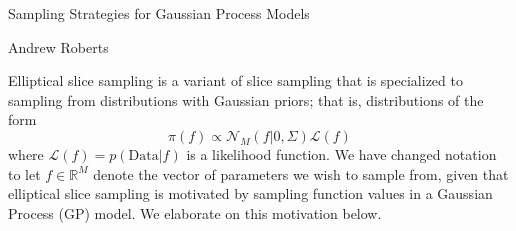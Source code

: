 \documentclass[12pt]{article}
\newcommand{\R}{\mathcal{R}}
\def\R{\mathbb{R}}
\begin{document}
 

\begin{center}
\Large
Sampling Strategies for Gaussian Process Models
\end{center}

\begin{flushright}
Andrew Roberts
\end{flushright} 

Elliptical slice sampling is a variant of slice sampling that is specialized to sampling from distributions with Gaussian priors; that is, distributions of the form 
\[\pi(f) \propto \mathcal{N}_M(f|0, \Sigma)\mathcal{L}(f)\]
where $\mathcal{L}(f) = p(\text{Data}|f)$ is a likelihood function. We have changed notation to let $f \in \R^M$ denote the vector of parameters we wish to sample from, given that elliptical slice sampling 
is motivated by sampling function values in a Gaussian Process (GP) model. We elaborate on this motivation below. 
\end{document}
